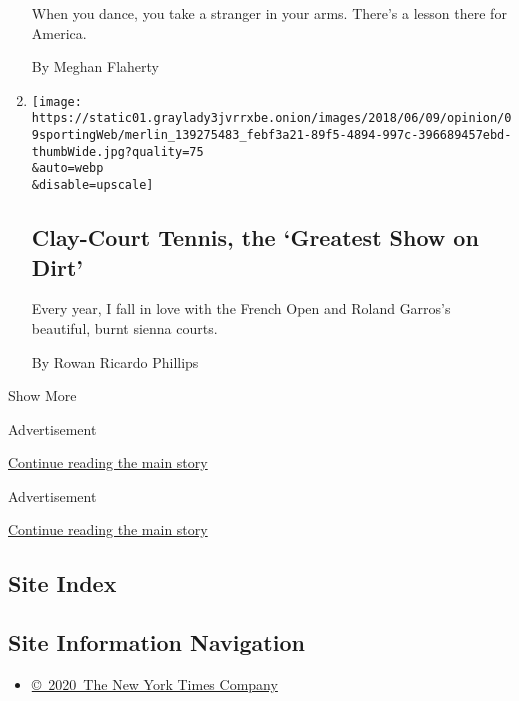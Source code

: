 \begin{enumerate}
  When you dance, you take a stranger in your arms. There's a lesson
  there for America.

  By Meghan Flaherty
\item
  \href{/2018/06/09/opinion/french-open-clay-roland-garros.html}{}

  \texttt{[image: https://static01.graylady3jvrrxbe.onion/images/2018/06/09/opinion/09sportingWeb/merlin\_139275483\_febf3a21-89f5-4894-997c-396689457ebd-thumbWide.jpg?quality=75\\\&auto=webp\\\&disable=upscale]}

  \hypertarget{clay-court-tennis-the-greatest-show-on-dirt}{%
  \subsection{Clay-Court Tennis, the `Greatest Show on
  Dirt'}\label{clay-court-tennis-the-greatest-show-on-dirt}}

  Every year, I fall in love with the French Open and Roland Garros's
  beautiful, burnt sienna courts.

  By Rowan Ricardo Phillips
\end{enumerate}

Show More

Advertisement

\protect\hyperlink{after-mid1}{Continue reading the main story}

Advertisement

\protect\hyperlink{after-mktg}{Continue reading the main story}

\hypertarget{site-index}{%
\subsection{Site Index}\label{site-index}}

\hypertarget{site-information-navigation}{%
\subsection{Site Information
Navigation}\label{site-information-navigation}}

\begin{itemize}
\tightlist
\item
  \href{https://help.nytimes3xbfgragh.onion/hc/en-us/articles/115014792127-Copyright-notice}{©~2020~The
  New York Times Company}
\end{itemize}

